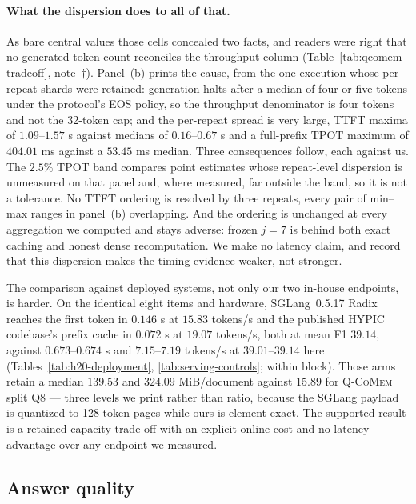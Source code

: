 \documentclass{article}
\newcommand{\qcomem}{\textsc{Q-CoMem}}
\begin{document}
\paragraph{What the dispersion does to all of that.}
As bare central values those cells concealed two facts, and readers were right
that no generated-token count reconciles the throughput column
(Table~\ref{tab:qcomem-tradeoff}, note~$\dagger$).  Panel~(b) prints the cause,
from the one execution whose per-repeat shards were retained: generation halts
after a median of four or five tokens under the protocol's EOS policy, so the
throughput denominator is four tokens and not the 32-token cap; and the
per-repeat spread is very large, TTFT maxima of $1.09$--$1.57$ s against medians
of $0.16$--$0.67$ s and a full-prefix TPOT maximum of $404.01$ ms against a
$53.45$ ms median.  Three consequences follow, each against us.  The $2.5\%$ TPOT
band compares point estimates whose repeat-level dispersion is unmeasured on that
panel and, where measured, far outside the band, so it is not a tolerance.  No
TTFT ordering is resolved by three repeats, every pair of min--max ranges in
panel~(b) overlapping.  And the ordering is unchanged at every aggregation we
computed and stays adverse: frozen $j=7$ is behind both exact caching and honest
dense recomputation.  We make no latency claim, and record that this dispersion
makes the timing evidence weaker, not stronger.

The comparison against deployed systems, not only our two in-house endpoints,
is harder.  On the identical eight items and
hardware, SGLang~0.5.17 Radix reaches the first token in $0.146$ s at $15.83$
tokens/s and the published HYPIC codebase's prefix cache in $0.072$ s at $19.07$
tokens/s, both at mean F1 $39.14$, against $0.673$--$0.674$ s and $7.15$--$7.19$
tokens/s at $39.01$--$39.14$ here (Tables~\ref{tab:h20-deployment},
\ref{tab:serving-controls}; within block).  Those arms retain a median $139.53$
and $324.09$ MiB/document against $15.89$ for \qcomem{} split Q8 --- three levels
we print rather than ratio, because the SGLang payload is quantized to 128-token
pages while ours is element-exact.  The supported result is a retained-capacity
trade-off with an explicit online cost and no latency advantage over any endpoint
we measured.


\subsection{Answer quality}
\label{sec:quality}
\end{document}
